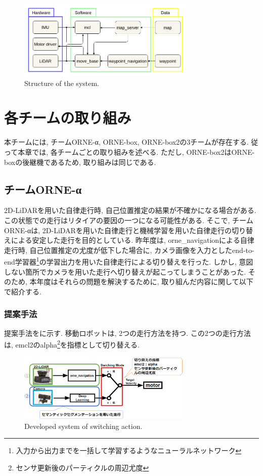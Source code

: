 \documentclass[uplatex, twocolumn, 9pt]{jsproceedings}
\begin{document}
\begin{figure}[h]
  \centering
  \includegraphics[width=85mm]{fig/software.pdf}
  \caption{Structure of the system.}
  \label{fig:soft-fig}%
\end{figure}

\section{各チームの取り組み}
本チームには, チームORNE-α, ORNE-box, ORNE-box2の3チームが存在する. 従って本章では, 各チームごとの取り組みを述べる. ただし, ORNE-box2はORNE-boxの後継機であるため, 取り組みは同じである.

\subsection{チームORNE-α}
2D-LiDARを用いた自律走行時, 自己位置推定の結果が不確かになる場合がある. この状態での走行はリタイアの要因の一つになる可能性がある. そこで, チームORNE-αは, 2D-LiDARを用いた自律走行と機械学習を用いた自律走行の切り替えによる安定した走行を目的としている. 昨年度は, orne\_navigationによる自律走行時, 自己位置推定の尤度が低下した場合に, カメラ画像を入力としたend-to-end学習器\footnote[1]{入力から出力までを一括して学習するようなニューラルネットワーク}\cite{end-to-end}の学習出力を用いた自律走行による切り替えを行った. しかし, 意図しない箇所でカメラを用いた走行へ切り替えが起こってしまうことがあった. そのため, 本年度はそれらの問題を解決するために, 取り組んだ内容に関して以下で紹介する. 

\subsubsection{提案手法}
提案手法をに示す. 移動ロボットは, 2つの走行方法を持つ. この2つの走行方法は, emcl2\cite{emcl2-git}のalpha\footnote[2]{センサ更新後のパーティクルの周辺尤度}を指標として切り替える.

\begin{figure}[h]
  \centering
  \includegraphics[width=83mm]{fig/kirikae.pdf}
  \caption{Developed system of switching action.}
  \label{fig:kirikae}%
\end{figure}
\end{document}
